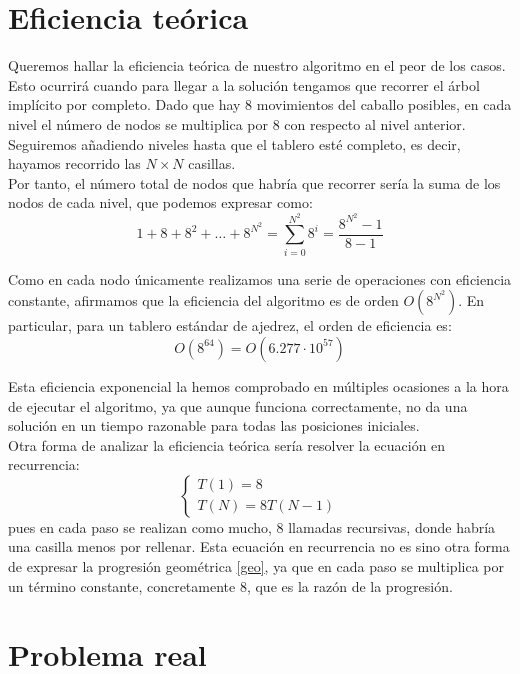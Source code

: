 \documentclass[11pt]{article}
\begin{document}
\section*{Eficiencia teórica}

Queremos hallar la eficiencia teórica de nuestro algoritmo en el peor de los casos. Esto ocurrirá cuando para llegar a la solución tengamos que recorrer el árbol implícito por completo. Dado que hay 8 movimientos del caballo posibles, en cada nivel el número de nodos se multiplica por 8 con respecto al nivel anterior. Seguiremos añadiendo niveles hasta que el tablero esté completo, es decir, hayamos recorrido las $N \times N$ casillas.\\

Por tanto, el número total de nodos que habría que recorrer sería la suma de los nodos de cada nivel, que podemos expresar como:
\begin{equation} \label{geo}
1 + 8 + 8^2 + \hdots + 8^{N^2} = \sum_{i=0}^{N^2} 8^i = \frac{8^{N^2} - 1}{8 - 1}
\end{equation}

Como en cada nodo únicamente realizamos una serie de operaciones con eficiencia constante, afirmamos que la eficiencia del algoritmo es de orden $O\left( 8^{N^2} \right)$. En particular, para un tablero estándar de ajedrez, el orden de eficiencia es: $$ O(8^{64}) = O(6.277 \cdot 10^{57} )$$

Esta eficiencia exponencial la hemos comprobado en múltiples ocasiones a la hora de ejecutar el algoritmo, ya que aunque funciona correctamente, no da una solución en un tiempo razonable para todas las posiciones iniciales.\\

Otra forma de analizar la eficiencia teórica sería resolver la ecuación en recurrencia: $$\begin{cases} T(1) = 8\\
                             T(N) = 8T(N-1)
\end{cases}$$ pues en cada paso se realizan como mucho, $8$ llamadas recursivas, donde habría una casilla menos por rellenar. Esta ecuación en recurrencia no es sino otra forma de expresar la progresión geométrica \eqref{geo}, ya que en cada paso se multiplica por un término constante, concretamente $8$, que es la razón de la progresión.


\section*{Problema real}
\end{document}
